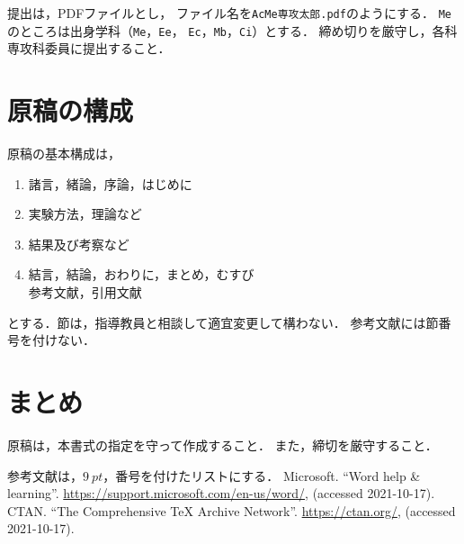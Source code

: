 \documentclass[
	fonts=word
	\ifdefined\kanjiskip , dvipdfmx \fi
]{ac-resume}
\begin{document}
提出は，PDFファイルとし，
ファイル名を\texttt{AcMe\mbox{}専攻太郎.pdf}のようにする．
\texttt{Me}のところは出身学科（\texttt{Me}，\texttt{Ee}，
\texttt{Ec}，\texttt{Mb}，\texttt{Ci}）とする．
締め切りを厳守し，各科専攻科委員に提出すること．

\section{原稿の構成}

原稿の基本構成は，
\begin{enumerate}
	\item 諸言，緒論，序論，はじめに
	\item 実験方法，理論など
	\item 結果及び考察など
	\item 結言，結論，おわりに，まとめ，むすび\\
	参考文献，引用文献
\end{enumerate}
とする．節は，指導教員と相談して適宜変更して構わない．
参考文献には節番号を付けない．

\section{まとめ}

原稿は，本書式の指定を守って作成すること．
また，締切を厳守すること．

\begin{thebibliography}{9}
	\small
	参考文献は，$\SI{9}{pt}$，番号を付けたリストにする．
	Microsoft. ``Word help \& learning''.
	\url{https://support.microsoft.com/en-us/word/},
	(accessed 2021-10-17).
	CTAN. ``The Comprehensive {\TeX} Archive Network''.
	\url{https://ctan.org/}, (accessed 2021-10-17).
\end{thebibliography}

\newpage
\end{document}
